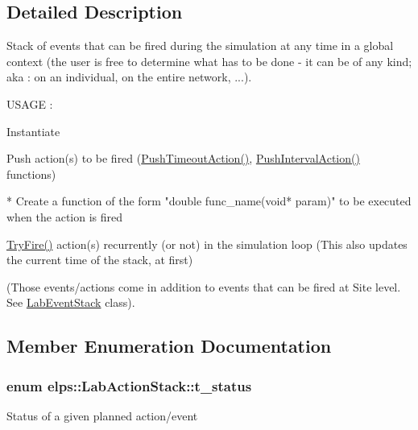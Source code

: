 \subsection{Detailed Description}
Stack of events that can be fired during the simulation at any time in a global context (the user is free to determine what has to be done -\/ it can be of any kind; aka \+: on an individual, on the entire network, ...).

U\+S\+A\+G\+E \+:


\begin{DoxyItemize}
\item Instantiate
\item Push action(s) to be fired (\hyperlink{classelps_1_1_lab_action_stack_a8ae2fb5ea16320aeb6dd5c8910d8cb3d}{Push\+Timeout\+Action()}, \hyperlink{classelps_1_1_lab_action_stack_a45fe60594dfa9b74e2746c9b40a47260}{Push\+Interval\+Action()} functions) \begin{DoxyVerb}          * Create a function of the form "double func_name(void* param)"
            to be executed when the action is fired
\end{DoxyVerb}

\item \hyperlink{classelps_1_1_lab_action_stack_a639ffa50c74766caa54f8bd243707bf3}{Try\+Fire()} action(s) recurrently (or not) in the simulation loop (This also updates the current time of the stack, at first)
\end{DoxyItemize}

(Those events/actions come in addition to events that can be fired at Site level. See \hyperlink{classelps_1_1_lab_event_stack}{Lab\+Event\+Stack} class). 

\subsection{Member Enumeration Documentation}
\hypertarget{classelps_1_1_lab_action_stack_a869b84c38d157b66a589f5b7bf2c447d}{
\subsubsection[{t\+\_\+status}]{\setlength{\rightskip}{0pt plus 5cm}enum {\bf elps\+::\+Lab\+Action\+Stack\+::t\+\_\+status}}}\label{classelps_1_1_lab_action_stack_a869b84c38d157b66a589f5b7bf2c447d}
Status of a given planned action/event 

